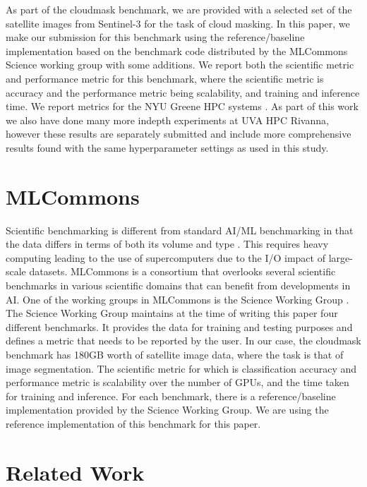 \documentclass[sigplan,screen]{acmart}
\begin{document}
As part of the cloudmask benchmark, we are provided with  a selected set of the satellite images from Sentinel-3 for the task of cloud masking. In this paper, we make our submission for this benchmark using the reference/baseline implementation based on the benchmark code distributed by the MLCommons Science working group with some additions. We report both the scientific metric and performance metric for this benchmark, where the scientific metric is accuracy and the performance metric being scalability, and training and inference time. We report metrics for the NYU Greene HPC systems \cite{www-greene}. As part of this work we also have done many more indepth experiments at UVA HPC Rivanna, however these results are separately submitted and include more comprehensive results found with the same hyperparameter settings as used in this study.

\section{MLCommons}

Scientific benchmarking is different from standard AI/ML benchmarking in that the data differs in terms of both its volume and type \cite{las-2023-mlcommons-edu-eq}. This requires heavy computing leading to the use of supercomputers  \cite{Farrell2021MLPerfHA} due to the I/O impact of large-scale datasets. MLCommons is a consortium that overlooks several scientific benchmarks in various scientific domains that can benefit from developments in AI. One of the working groups in MLCommons is the Science Working Group \cite{Thiyagalingam2022AIBF}. The Science Working Group maintains at the time of writing this paper four different benchmarks. It provides the data for training and testing purposes and defines a metric that needs to be reported by the user. In our case, the cloudmask benchmark has 180GB worth of satellite image data, where the task is that of image segmentation. The scientific metric for which is classification accuracy and performance metric is scalability over the number of GPUs, and the time taken for training and inference. 
For each benchmark, there is a reference/baseline implementation provided by the Science Working Group. We are using the reference implementation of this benchmark for this paper.

\section{Related Work}
\end{document}
